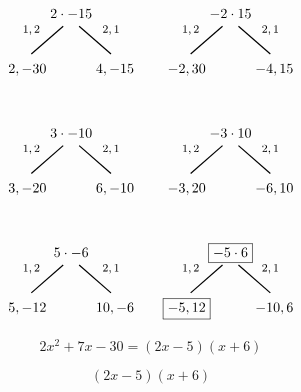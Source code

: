 \documentclass[12pt,letterpaper]{exam}
\begin{document}
\begin{questions}
\[\begin{tikzpicture}
	\node at (0,0) {$2 \cdot -15$};
	\node at (-1.0,-0.4) {\footnotesize$1, 2$};
	\draw[line width=0.03cm,label={1}] (-0.2,-0.3) -- (-1,-1);
	\node at (-1.1,-1.4) {$2, -30$};
	\node at (1.0,-0.4) {\footnotesize$2, 1$};
	\draw[line width=0.03cm] (0.2,-0.3) -- (1,-1);
	\node at (1.1,-1.4) {$4, -15$};
	
	\tikzset{shift={(4,0)}}

	\node at (0,0) {$-2 \cdot 15$};
	\node at (-1.0,-0.4) {\footnotesize$1, 2$};
	\draw[line width=0.03cm,label={1}] (-0.2,-0.3) -- (-1,-1);
	\node at (-1.1,-1.4) {$-2, 30$};
	\node at (1.0,-0.4) {\footnotesize$2, 1$};
	\draw[line width=0.03cm] (0.2,-0.3) -- (1,-1);
	\node at (1.1,-1.4) {$-4, 15$};

	\tikzset{shift={(-4,-3)}}
	
	\node at (0,0) {$3 \cdot -10$};
	\node at (-1.0,-0.4) {\footnotesize$1, 2$};
	\draw[line width=0.03cm,label={1}] (-0.2,-0.3) -- (-1,-1);
	\node at (-1.1,-1.4) {$3, -20$};
	\node at (1.0,-0.4) {\footnotesize$2, 1$};
	\draw[line width=0.03cm] (0.2,-0.3) -- (1,-1);
	\node at (1.1,-1.4) {$6, -10$};
	
	\tikzset{shift={(4,0)}}

	\node at (0,0) {$-3 \cdot 10$};
	\node at (-1.0,-0.4) {\footnotesize$1, 2$};
	\draw[line width=0.03cm,label={1}] (-0.2,-0.3) -- (-1,-1);
	\node at (-1.1,-1.4) {$-3, 20$};
	\node at (1.0,-0.4) {\footnotesize$2, 1$};
	\draw[line width=0.03cm] (0.2,-0.3) -- (1,-1);
	\node at (1.1,-1.4) {$-6, 10$};

	\tikzset{shift={(-4,-3)}}
	
	\node at (0,0) {$5 \cdot -6$};
	\node at (-1.0,-0.4) {\footnotesize$1, 2$};
	\draw[line width=0.03cm,label={1}] (-0.2,-0.3) -- (-1,-1);
	\node at (-1.1,-1.4) {$5, -12$};
	\node at (1.0,-0.4) {\footnotesize$2, 1$};
	\draw[line width=0.03cm] (0.2,-0.3) -- (1,-1);
	\node at (1.1,-1.4) {$10, -6$};
	
	\tikzset{shift={(4,0)}}

	\node at (0,0) {\framebox{$-5 \cdot 6$}};
	\node at (-1.0,-0.4) {\footnotesize$1, 2$};
	\draw[line width=0.03cm,label={1}] (-0.2,-0.3) -- (-1,-1);
	\node at (-1.1,-1.4) {\framebox{$-5, 12$}};
	\node at (1.0,-0.4) {\footnotesize$2, 1$};
	\draw[line width=0.03cm] (0.2,-0.3) -- (1,-1);
	\node at (1.1,-1.4) {$-10, 6$};
	\end{tikzpicture}
	\]

	\[
	2x^2 + 7x - 30= (2x - 5)(x + 6)
	\] \pspace
	
	\[
	\boxed{(2x - 5)(x + 6)}
	\]






\end{questions}
\end{document}
